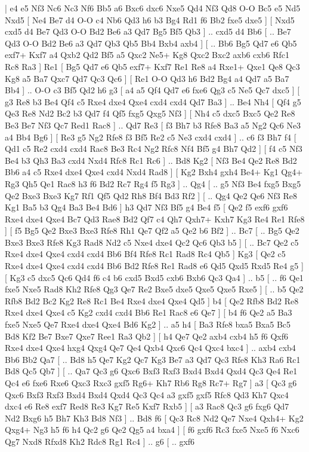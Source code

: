 \makegametitle 
|   e4   e5    Nf3   Nc6    Nc3   Nf6    Bb5   a6    Bxc6   dxc6    Nxe5   Qd4    Nf3   Qd8    O-O   Bc5    e5   Nd5    Nxd5 [  Ne4 Be7  d4 O-O  c4 Nb6  Qd3 h6  b3 Bg4  Rd1 f6  Bb2 fxe5  dxe5   ]  [  Nxd5 cxd5  d4 Be7  Qd3 O-O  Bd2 Be6  a3 Qd7  Bg5 Bf5  Qb3   ] .. cxd5    d4   Bb6 [ .. Be7  Qd3 O-O  Bd2 Be6  a3 Qd7  Qb3 Qb5  Bb4 Bxb4  axb4   ]  [ .. Bb6  Bg5 Qd7  e6 Qb5  exf7+ Kxf7  a4 Qxb2  Qd2 Bf5  a5 Qxc2  Ne5+ Kg8  Qxc2 Bxc2  axb6 cxb6  Rfc1 Rc8  Ra3   ]  Re1 [  Bg5 Qd7  e6 Qb5  exf7+ Kxf7  Re1 Re8  a4 Rxe1+  Qxe1 Qe8  Qc3 Kg8  a5 Ba7  Qxc7 Qd7  Qc3 Qc6   ]  [  Re1 O-O  Qd3 h6  Bd2 Bg4  a4 Qd7  a5 Ba7  Bb4   ] .. O-O    c3   Bf5    Qd2   h6    g3 [  a4 a5  Qf4 Qd7  e6 fxe6  Qg3 c5  Ne5 Qc7  dxc5   ]  [  g3 Re8  b3 Be4  Qf4 c5  Rxe4 dxe4  Qxe4 cxd4  cxd4 Qd7  Ba3   ] .. Be4    Nh4 [  Qf4 g5  Qe3 Re8  Nd2 Bc2  b3 Qd7  f4 Qf5  fxg5 Qxg5  Nf3   ]  [  Nh4 c5  dxc5 Bxc5  Qe2 Re8  Be3 Be7  Nf3 Qc7  Red1 Rac8   ] .. Qd7    Re3 [  f3 Bh7  b3 Rfe8  Ba3 a5  Ng2 Qc6  Ne3 a4  Bb4 Bg6   ]  [  Re3 g5  Ng2 Rfe8  f3 Bf5  Re2 c5  Ne3 cxd4  cxd4   ] .. c6    f3   Bh7    f4 [  Qd1 c5  Re2 cxd4  cxd4 Rac8  Be3 Rc4  Ng2 Rfc8  Nf4 Bf5  g4 Bh7  Qd2   ]  [  f4 c5  Nf3 Be4  b3 Qh3  Ba3 cxd4  Nxd4 Rfc8  Rc1 Rc6   ] .. Bd8    Kg2 [  Nf3 Be4  Qe2 Re8  Bd2 Bb6  a4 c5  Rxe4 dxe4  Qxe4 cxd4  Nxd4 Rad8   ]  [  Kg2 Bxh4  gxh4 Be4+  Kg1 Qg4+  Rg3 Qh5  Qe1 Rac8  h3 f6  Bd2 Rc7  Rg4 f5  Rg3   ] .. Qg4 [ .. g5  Nf3 Be4  fxg5 Bxg5  Qe2 Bxe3  Bxe3 Kg7  Rf1 Qf5  Qd2 Rh8  Bf4 Bd3  Rf2   ]  [ .. Qg4  Qe2 Qe6  Nf3 Re8  Kg1 Ba5  b3 Qg4  Ba3 Be4  Bd6   ]  h3   Qd7    Nf3   Bf5    g4   Be4    f5 [  Qe2 f5  exf6 gxf6  Rxe4 dxe4  Qxe4 Bc7  Qd3 Rae8  Bd2 Qf7  c4 Qh7  Qxh7+ Kxh7  Kg3 Re4  Re1 Rfe8   ]  [  f5 Bg5  Qe2 Bxe3  Bxe3 Rfe8  Rh1 Qe7  Qf2 a5  Qe2 b6  Bf2   ] .. Bc7 [ .. Bg5  Qe2 Bxe3  Bxe3 Rfe8  Kg3 Rad8  Nd2 c5  Nxe4 dxe4  Qc2 Qc6  Qb3 b5   ]  [ .. Bc7  Qe2 c5  Rxe4 dxe4  Qxe4 cxd4  cxd4 Bb6  Bf4 Rfe8  Rc1 Rad8  Rc4 Qb5   ]  Kg3 [  Qe2 c5  Rxe4 dxe4  Qxe4 cxd4  cxd4 Bb6  Bd2 Rfe8  Re1 Rad8  e6 Qd5  Qxd5 Rxd5  Re4 g5   ]  [  Kg3 c5  dxc5 Qc6  Qd4 f6  c4 b6  cxd5 Bxd5  cxb6 Bxb6  Qc3 Qa4   ] .. b5 [ .. f6  Qe1 fxe5  Nxe5 Rad8  Kh2 Rfe8  Qg3 Qe7  Re2 Bxe5  dxe5 Qxe5  Qxe5 Rxe5   ]  [ .. b5  Qe2 Rfb8  Bd2 Bc2  Kg2 Re8  Rc1 Be4  Rxe4 dxe4  Qxe4 Qd5   ]  b4 [  Qe2 Rfb8  Bd2 Re8  Rxe4 dxe4  Qxe4 c5  Kg2 cxd4  cxd4 Bb6  Re1 Rac8  e6 Qe7   ]  [  b4 f6  Qe2 a5  Ba3 fxe5  Nxe5 Qe7  Rxe4 dxe4  Qxe4 Bd6  Kg2   ] .. a5    h4 [  Ba3 Rfe8  bxa5 Bxa5  Bc5 Bd8  Kf2 Be7  Bxe7 Qxe7  Ree1 Ra3  Qb2   ]  [  h4 Qe7  Qe2 axb4  cxb4 h5  f6 Qxf6  Rxe4 dxe4  Qxe4 hxg4  Qxg4 Qe7  Qe4 Qxb4  Qxc6 Qc4  Qxc4 bxc4   ] .. axb4    cxb4   Bb6    Bb2   Qa7 [ .. Bd8  h5 Qe7  Kg2 Qc7  Kg3 Be7  a3 Qd7  Qc3 Rfe8  Kh3 Ra6  Rc1 Bd8  Qc5 Qb7   ]  [ .. Qa7  Qc3 g6  Qxc6 Bxf3  Rxf3 Bxd4  Bxd4 Qxd4  Qc3 Qe4  Re1 Qc4  e6 fxe6  Rxe6 Qxc3  Rxc3 gxf5  Rg6+ Kh7  Rb6 Rg8  Rc7+ Rg7   ]  a3 [  Qc3 g6  Qxc6 Bxf3  Rxf3 Bxd4  Bxd4 Qxd4  Qc3 Qc4  a3 gxf5  gxf5 Rfc8  Qd3 Kh7  Qxc4 dxc4  e6 Re8  exf7 Red8  Re3 Kg7  Re5 Kxf7  Rxb5   ]  [  a3 Rac8  Qc3 g6  fxg6 Qd7  Nd2 Bxg6  h5 Bh7  Kh3 Bd8  Nf3   ] .. Bd8    f6 [  Qc3 Rc8  Nd2 Qe7  Nxe4 Qxh4+  Kg2 Qxg4+  Ng3 h5  f6 h4  Qc2 g6  Qe2 Qg5  a4 bxa4   ]  [  f6 gxf6  Rc3 fxe5  Nxe5 f6  Nxc6 Qg7  Nxd8 Rfxd8  Kh2 Rdc8  Rg1 Rc4   ] .. g6 [ .. gxf6  